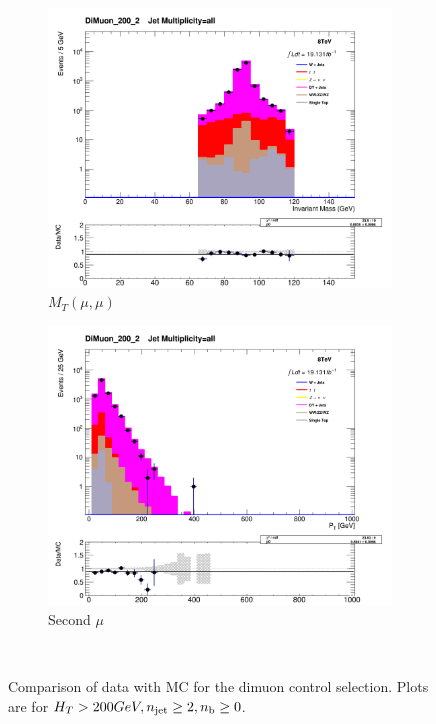 \begin{figure}[!ht]
  \centering
    \begin{subfigure}[b]{0.48\textwidth}
      \includegraphics[width=\textwidth]{Figs/datamc/mumu/Stacked_DiMuon_Mass_all_DiMuon_200_upwards}
      \caption{$M_T(\mu, \mu)$}
    \end{subfigure}
    \begin{subfigure}[b]{0.48\textwidth}
      \includegraphics[width=\textwidth]{Figs/datamc/mumu/Stacked_SecondMuPt_all_DiMuon_200_upwards}
      \caption{Second $\mu$ \Pt}
    \end{subfigure} \\
    \caption{\label{fig:datamc_mumu_inc}
    Comparison of data with MC for the dimuon control selection. Plots 
    are for $H_T>200GeV, n_{\text{jet}}\geq2, n_{\text{b}}\geq0$.
    }
\end{figure}

